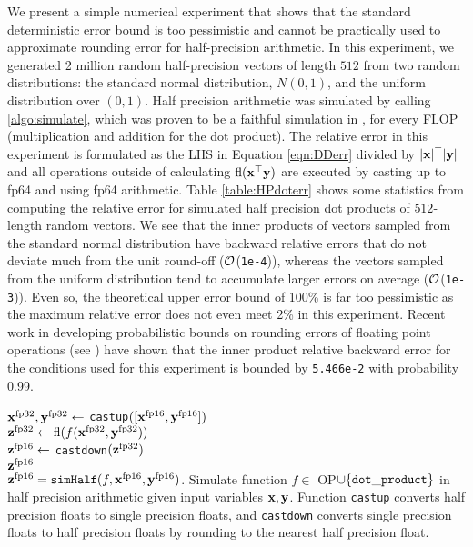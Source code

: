 We present a simple numerical experiment that shows that the standard deterministic error bound is too pessimistic and cannot be practically used to approximate rounding error for half-precision arithmetic. 
In this experiment, we generated 2 million random half-precision vectors of length $512$ from two random distributions: the standard normal distribution, $N(0,1)$, and the uniform distribution over $(0,1)$.
Half precision arithmetic was simulated by calling \cref{algo:simulate}, which was proven to be a faithful simulation in \cite{HighamPranesh2019b}, for every FLOP (multiplication and addition for the dot product).
The relative error in this experiment is formulated as the LHS in Equation \ref{eqn:DDerr} divided by $|\mathbf{x}|^{\top}|\mathbf{y}|$ and all operations outside of calculating $\mathrm{fl}(\mathbf{x}^{\top}\mathbf{y})$ are executed by casting up to fp64 and using fp64 arithmetic.
Table \ref{table:HPdoterr} shows some statistics from computing the relative error for simulated half precision dot products of $512$-length random vectors. 
We see that the inner products of vectors sampled from the standard normal distribution have backward relative errors that do not deviate much from the unit round-off ($\mathcal{O}$({\tt 1e-4})), whereas the vectors sampled from the uniform distribution tend to accumulate larger errors on average ($\mathcal{O}$({\tt 1e-3})). 
Even so, the theoretical upper error bound of 100\% is far too pessimistic as the maximum relative error does not even meet 2\% in this experiment.
Recent work in developing probabilistic bounds on rounding errors of floating point operations (see \cite{Higham2019a,Ipsen2019}) have shown that the inner product relative backward error for the conditions used for this experiment is bounded by {\tt 5.466e-2} with probability 0.99. \par
\begin{algorithm2e}
	\DontPrintSemicolon %
	$\mathbf{x}^{\text{fp32}}, \mathbf{y}^{\text{fp32}} \gets$ {\tt castup}$([\mathbf{x}^{\text{fp16}},\mathbf{y}^{\text{fp16}}])$\\
	$\mathbf{z}^{\text{fp32}} \gets \mathrm{fl}(f(\mathbf{x}^{\text{fp32}}, \mathbf{y}^{\text{fp32}}))$\\
	$\mathbf{z}^{\text{fp16}} \gets$ {\tt castdown}$(\mathbf{z}^{\text{fp32}})$\\
	\Return $\mathbf{z}^{\text{fp16}}$\\
	\caption{$\mathbf{z}^{\text{fp16}} = {\tt simHalf}(f, \mathbf{x}^{\text{fp16}}, \mathbf{y}^{\text{fp16}})$. Simulate function $f\in$ OP$\cup \{{\tt dot\_product} \}$ in half precision arithmetic given input variables $\mathbf{x},\mathbf{y}$. Function {\tt castup} converts half precision floats to single precision floats, and {\tt castdown} converts single precision floats to half precision floats by rounding to the nearest half precision float.}
	\label{algo:simulate}
\end{algorithm2e}
